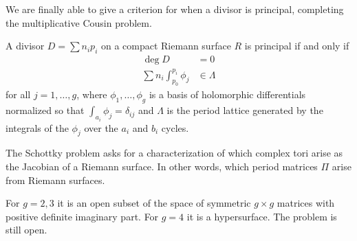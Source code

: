 \documentclass[12pt]{article}
\begin{document}
We are finally able to give a criterion for when a divisor is principal, completing the multiplicative Cousin problem.
\begin{theorem}
    A divisor $D = \sum n_i p_i$ on a compact Riemann surface $R$ is principal if and only if \begin{align*}
        \deg D & = 0 \\
        \sum n_i \int_{p_0}^{p_i} \phi_j & \in \Lambda
    \end{align*} for all $j=1, \ldots, g$, where $\phi_1, \ldots, \phi_g$ is a basis of holomorphic differentials normalized so that $\int_{a_i} \phi_j = \delta_{ij}$ and $\Lambda$ is the period lattice generated by the integrals of the $\phi_j$ over the $a_i$ and $b_i$ cycles.  
\end{theorem}

\begin{remark}
    The Schottky problem asks for a characterization of which complex tori arise as the Jacobian of a Riemann surface. In other words, which period matrices $\Pi$ arise from Riemann surfaces. 

    For $g=2,3$ it is an open subset of the space of symmetric $g \times g$ matrices with positive definite imaginary part. For $g=4$ it is a hypersurface. The problem is still open.
\end{remark}
\end{document}
